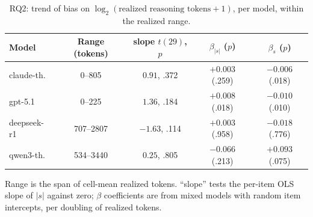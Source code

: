 \begin{table}[!t]
\centering
\caption{RQ2: trend of bias on $\log_2(\text{realized reasoning tokens}+1)$, per model, within the realized range.}
\label{tab:rq2}
\footnotesize
\setlength{\tabcolsep}{3pt}
\begin{tabular}{lcccc}
\hline
Model & Range (tokens) & slope $t(29)$, $p$ & $\beta_{|s|}$ ($p$) & $\beta_{s}$ ($p$) \\
\hline
claude-th. & 0--805 & $0.91$, .372 & $+0.003$ (.259) & $-0.006$ (.018) \\
gpt-5.1 & 0--225 & $1.36$, .184 & $+0.008$ (.018) & $-0.010$ (.010) \\
deepseek-r1 & 707--2807 & $-1.63$, .114 & $+0.003$ (.958) & $-0.018$ (.776) \\
qwen3-th. & 534--3440 & $0.25$, .805 & $-0.066$ (.213) & $+0.093$ (.075) \\
\hline
\end{tabular}
\par\smallskip\footnotesize Range is the span of cell-mean realized tokens. ``slope'' tests the per-item OLS slope of $|s|$ against zero; $\beta$ coefficients are from mixed models with random item intercepts, per doubling of realized tokens.
\end{table}
